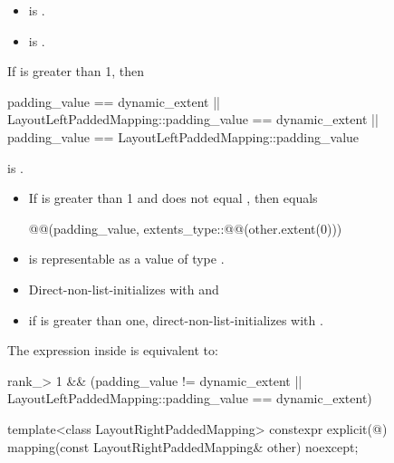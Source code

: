 \begin{itemdescr}
\pnum
\constraints
\begin{itemize}
\item
{}
is .
\item
{}
\newline is .
\end{itemize}

\pnum
\mandates
If  is greater than 1,
then
\begin{codeblock}
padding_value == dynamic_extent ||
LayoutLeftPaddedMapping::padding_value == dynamic_extent ||
padding_value == LayoutLeftPaddedMapping::padding_value
\end{codeblock}
is .

\pnum
\begin{itemize}
\item
If  is greater than 1 and
 does not equal ,
then  equals
\begin{codeblock}
@@(padding_value,
                        extents_type::@@(other.extent(0)))
\end{codeblock}
\item
{} is representable as
a value of type .
\end{itemize}

\pnum
\effects
\begin{itemize}
\item
Direct-non-list-initializes  with  and
\item
if  is greater than one,
direct-non-list-initializes  with .
\end{itemize}

\pnum
\remarks
The expression inside  is equivalent to:
\begin{codeblock}
rank_> 1 &&
(padding_value != dynamic_extent ||
 LayoutLeftPaddedMapping::padding_value == dynamic_extent)
\end{codeblock}
\end{itemdescr}

%
\begin{itemdecl}
template<class LayoutRightPaddedMapping>
  constexpr explicit(@\seebelow@)
    mapping(const LayoutRightPaddedMapping& other) noexcept;
\end{itemdecl}

